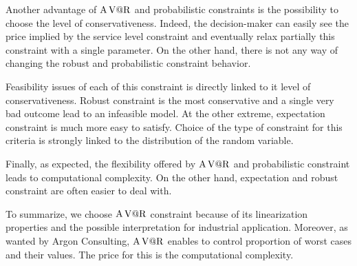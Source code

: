 Another advantage of $\operatorname{A\operatorname{V@R}}$ and probabilistic constraints is the possibility to choose the level of conservativeness.
Indeed, the decision-maker can easily see the price implied by the service level constraint and eventually relax partially this constraint with a single parameter.
On the other hand, there is not any way of changing the robust and probabilistic constraint behavior.


Feasibility issues of each of this constraint is directly linked to it level of conservativeness.
Robust constraint is the most conservative and a single very bad outcome lead to an infeasible model.
At the other extreme, expectation constraint is much more easy to satisfy.
Choice of the type of constraint for this criteria is strongly linked to the distribution of the random variable.


Finally, as expected, the flexibility offered by $\operatorname{A\operatorname{V@R}}$ and probabilistic constraint leads to computational complexity.
On the other hand, expectation and robust constraint are often easier to deal with.


\medskip


To summarize, we choose $\operatorname{A\operatorname{V@R}}$ constraint because of its linearization properties and the possible interpretation for industrial application.
Moreover, as wanted by Argon Consulting, $\operatorname{A\operatorname{V@R}}$ enables to control proportion of worst cases and their values.
The price for this is the computational complexity.

